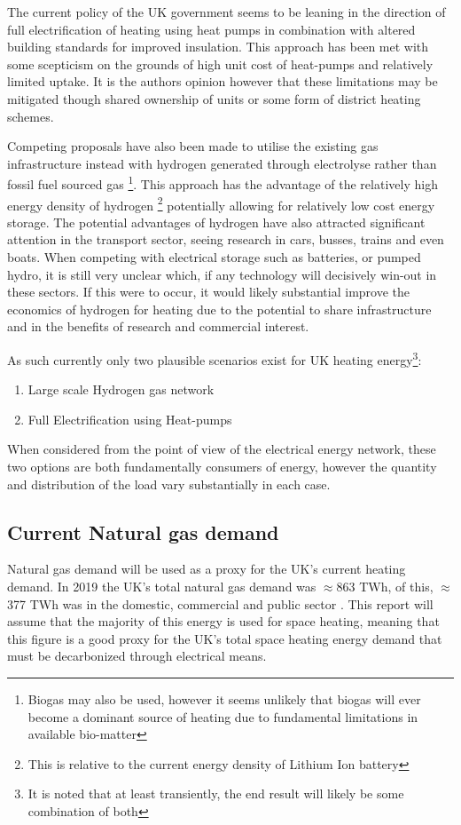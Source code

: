 \documentclass[11pt]{article}
\numberwithin{equation}{section}
\begin{document}
The current policy of the UK government seems to be leaning in the direction of full electrification of heating using heat pumps in combination with altered building standards for improved insulation. This approach has been met with some scepticism on the grounds of high unit cost of heat-pumps and relatively limited uptake. It is the authors opinion however that these limitations may be mitigated though shared ownership of units or some form of district heating schemes.

Competing proposals have also been made to utilise the existing gas infrastructure instead with hydrogen generated through electrolyse rather than fossil fuel sourced gas \footnote{Biogas may also be used, however it seems unlikely that biogas will ever become a dominant source of heating due to fundamental limitations in available bio-matter}. This approach has the advantage of the relatively high energy density of hydrogen \footnote{This is relative to the current energy density of Lithium Ion battery} potentially allowing for relatively low cost energy storage. The potential advantages of hydrogen have also attracted significant attention in the transport sector, seeing research in cars, busses, trains and even boats. When competing with electrical storage such as batteries, or pumped hydro, it is still very unclear which, if any technology will decisively win-out in these sectors. If this were to occur,  it would likely substantial improve the economics of hydrogen for heating due to the potential to share infrastructure and in the benefits of research and commercial interest.

As such currently only two plausible scenarios exist for UK heating energy\footnote{It is noted that at least transiently, the end result will likely be some combination of both}:
\begin{enumerate}
\item Large scale Hydrogen gas network
\item Full Electrification using Heat-pumps
\end{enumerate}

When considered from the point of view of the electrical energy network, these two options are both fundamentally consumers of energy, however the quantity and distribution of the load vary substantially in each case.
\subsection{Current Natural gas demand \label{secCurrentNatGasDemand}}
\label{sec:orga2cbfc3}
Natural gas demand will be used as a proxy for the UK's current heating demand. In 2019 the UK's total natural gas demand was \(\approx\)863 TWh, of this, \(\approx\)377 TWh was in the domestic, commercial and public sector \cite{NaturalGas}. This report will assume that the majority of this energy is used for space heating, meaning that this figure is a good proxy for the UK's total space heating energy demand that must be decarbonized through electrical means.
\end{document}
